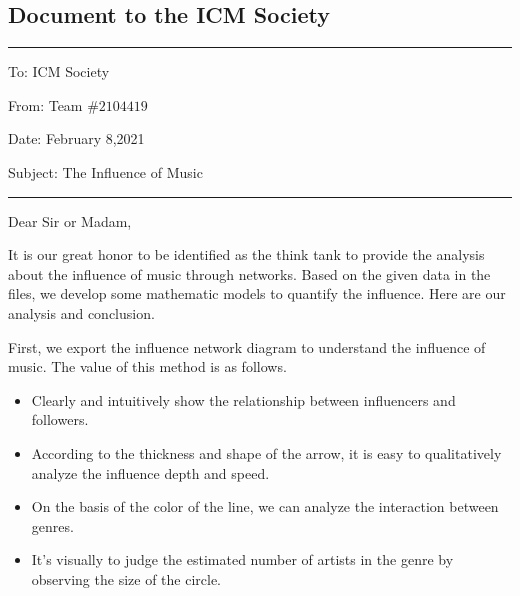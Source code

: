 \documentclass{mcmthesis}
\begin{document}
\begin{appendices}
\section{Document to the ICM Society}
\rule{\textwidth}{02pt}

\noindent%
To: ICM Society

\noindent%
From: Team $\# 2104419$

\noindent%
Date: February 8,2021

\noindent%
Subject: The Influence of Music

\noindent%
\rule{\textwidth}{02pt}
Dear Sir or Madam,

It is our great honor to be identified as the think tank to provide the analysis about the influence of music through networks. Based on the given data in the files, we develop some mathematic models to quantify the influence. Here are our analysis and conclusion.

First, we export the influence network diagram to understand the influence of music. The value of this method is as follows.
\begin{itemize}
	\item Clearly and intuitively show the relationship between influencers and followers.
	\item According to the thickness and shape of the arrow, it is easy to qualitatively analyze the influence depth and speed.
	\item On the basis of the color of the line, we can analyze the interaction between genres.
	\item It's visually to judge the estimated number of artists in the genre by observing the size of the circle.
\end{itemize}


\end{appendices}
\end{document}
